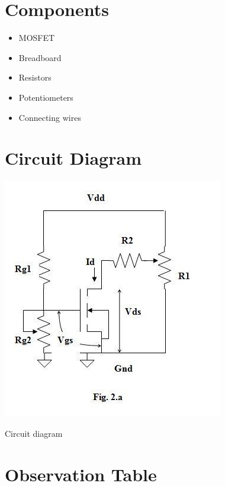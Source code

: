 \documentclass[12pt]{article}
\begin{document}
\section*{Components}
\begin{itemize}
    \item MOSFET
    \item Breadboard
    \item Resistors 
    \item Potentiometers
    \item Connecting wires
\end{itemize}

\section*{Circuit Diagram}
\includegraphics{ckt.jpg}
  \caption{Circuit diagram}
  

\section*{Observation Table}
\end{document}
